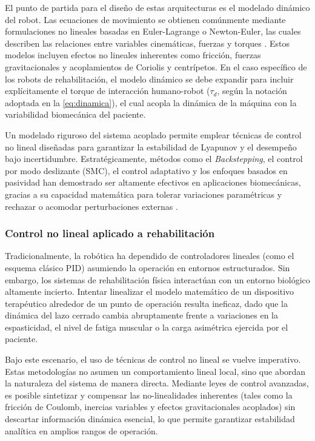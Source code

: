 \documentclass[a4paper,12pt]{article}
\begin{document}
El punto de partida para el diseño de estas arquitecturas es el modelado dinámico del robot. Las ecuaciones de movimiento se obtienen comúnmente mediante formulaciones no lineales basadas en Euler-Lagrange o Newton-Euler, las cuales describen las relaciones entre variables cinemáticas, fuerzas y torques \citep{spong2006robot, siciliano2010robotics}. Estos modelos incluyen efectos no lineales inherentes como fricción, fuerzas gravitacionales y acoplamientos de Coriolis y centrípetos. En el caso específico de los robots de rehabilitación, el modelo dinámico se debe expandir para incluir explícitamente el torque de interacción humano-robot ($\tau_{d}$, según la notación adoptada en la \cref{eq:dinamica}), el cual acopla la dinámica de la máquina con la variabilidad biomecánica del paciente.

Un modelado riguroso del sistema acoplado permite emplear técnicas de control no lineal diseñadas para garantizar la estabilidad de Lyapunov y el desempeño bajo incertidumbre. Estratégicamente, métodos como el \textit{Backstepping}, el control por modo deslizante (SMC), el control adaptativo y los enfoques basados en pasividad han demostrado ser altamente efectivos en aplicaciones biomecánicas, gracias a su capacidad matemática para tolerar variaciones paramétricas y rechazar o acomodar perturbaciones externas \citep{khalil2002nonlinear}.

\subsubsection{Control no lineal aplicado a rehabilitación}

Tradicionalmente, la robótica ha dependido de controladores lineales (como el esquema clásico PID) asumiendo la operación en entornos estructurados. Sin embargo, los sistemas de rehabilitación física interactúan con un entorno biológico altamente incierto. Intentar linealizar el modelo matemático de un dispositivo terapéutico alrededor de un punto de operación resulta ineficaz, dado que la dinámica del lazo cerrado cambia abruptamente frente a variaciones en la espasticidad, el nivel de fatiga muscular o la carga asimétrica ejercida por el paciente.

Bajo este escenario, el uso de técnicas de control no lineal se vuelve imperativo. Estas metodologías no asumen un comportamiento lineal local, sino que abordan la naturaleza del sistema de manera directa. Mediante leyes de control avanzadas, es posible sintetizar y compensar las no-linealidades inherentes (tales como la fricción de Coulomb, inercias variables y efectos gravitacionales acoplados) sin descartar información dinámica esencial, lo que permite garantizar estabilidad analítica en amplios rangos de operación. %
\end{document}
